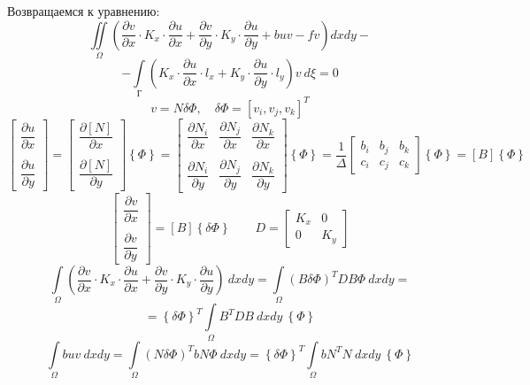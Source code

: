 \documentclass{bmstu}
\begin{document}
	Возвращаемся к уравнению:
	\[
	\iint\limits_{\Omega} \left(\frac{\partial v}{\partial x} \cdot K_x \cdot  \frac{\partial u}{\partial x} + \frac{\partial v}{\partial y} \cdot K_y \cdot  \frac{\partial u}{\partial y} + buv-fv \right)dxdy-\]
	\[-\int\limits_{\text{Г}} \left(K_x \cdot  \frac{\partial u}{\partial x} \cdot l_x + K_y \cdot  \frac{\partial u}{\partial y} \cdot l_y \right)v\ d\xi = 0
	\]
	\[
	v=N\delta\Phi, \quad \delta\Phi=\left[v_i, v_j, v_k\right]^T
	\]
	\[
	\begin{bmatrix}
		\dfrac{\partial u}{\partial x} \\ \\ \dfrac{\partial u}{\partial y} 
	\end{bmatrix} = \begin{bmatrix}
	\dfrac{\partial \left[N\right]}{\partial x} \\  \\ \dfrac{\partial \left[N\right] }{\partial y} 
	\end{bmatrix} \left\{\Phi\right\} = \begin{bmatrix}
	\dfrac{\partial N_i}{\partial x} & \dfrac{\partial N_j}{\partial x} & \dfrac{\partial N_k}{\partial x} \\ & & \\ \dfrac{\partial N_i}{\partial y} & \dfrac{\partial N_j}{\partial y} & \dfrac{\partial N_k}{\partial y}
	\end{bmatrix} \left\{\Phi\right\} = \dfrac{1}{\Delta} \begin{bmatrix}
	b_i & b_ j & b_k \\ c_i & c_j & c_k
	\end{bmatrix} \left\{\Phi\right\} = \left[B\right] \left\{\Phi\right\}
	\]
	\[
	\begin{bmatrix}
		\dfrac{\partial v}{\partial x} \\ \\	\dfrac{\partial v}{\partial y}
	\end{bmatrix} = \left[B\right] \left\{\delta\Phi\right\} \qquad D=\begin{bmatrix}
	K_x & 0 \\ 0 & K_y
	\end{bmatrix}
	\]
	\[
	\int\limits_{\Omega} \left(\frac{\partial v}{\partial x} \cdot K_x \cdot  \frac{\partial u}{\partial x} + \frac{\partial v}{\partial y} \cdot K_y \cdot  \frac{\partial u}{\partial y}\right)\ dxdy = \int\limits_{\Omega} (B\delta\Phi)^TDB\Phi\ dxdy=
	\] 
	\[
	=\left\{ \delta \Phi \right\}^T \int\limits_{\Omega} B^T D B \ dxdy \ \left\{ \Phi \right\}
	\]
	\[
	\int\limits_{\Omega}  buv \ dxdy = \int\limits_{\Omega}  (N\delta \Phi) ^ T bN \Phi \ dxdy = \left\{ \delta \Phi \right\}^T \int\limits_{\Omega} bN^T N \ dxdy \ \left\{ \Phi \right\}
	\]
\end{document}
